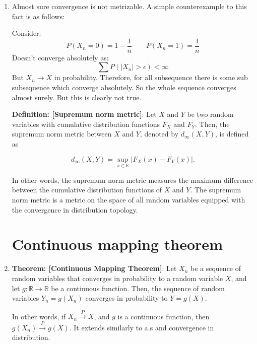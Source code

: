 \documentclass[12pt,oneside]{book}
\begin{document}
\begin{enumerate}
\item Almost sure convergence is not metrizable. A simple counterexample to this fact is as follows:

Consider:
$$P(X_n=0)=1-\frac{1}{n}\qquad P(X_n=1)=\frac{1}{n}$$
Doesn't converge absolutely as:
$$\sum P\left(|X_n|>\epsilon\right)<\infty$$
But $X_n\to X$ in probability. Therefore, for all subsequence there  is some sub subsequence which converge absolutely. So the whole sequence converges almost surely. But this is clearly not true.

\textbf{Definition: [Supremum norm metric]}: Let $X$ and $Y$ be two random variables with cumulative distribution functions $F_X$ and $F_Y$. Then, the supremum norm metric between $X$ and $Y$, denoted by $d_{\infty}(X,Y)$, is defined as

\begin{equation*}
d_{\infty}(X,Y) = \sup_{x\in\mathbb{R}} |F_X(x) - F_Y(x)|.
\end{equation*}

In other words, the supremum norm metric measures the maximum difference between the cumulative distribution functions of $X$ and $Y$.
The supremum norm metric is a metric on the space of all random variables equipped with the convergence in distribution topology.

\section{Continuous mapping theorem}
\item \textbf{Theorem: [Continuous Mapping Theorem]}: Let $X_n$ be a sequence of random variables that converges in probability to a random variable $X$, and let $g:\mathbb{R}\to\mathbb{R}$ be a continuous function. Then, the sequence of random variables $Y_n = g(X_n)$ converges in probability to $Y = g(X)$.

In other words, if $X_n \xrightarrow{P} X$, and $g$ is a continuous function, then $g(X_n) \xrightarrow{P} g(X)$.
It extends similarly to a.s and convergence in distribution.

\end{enumerate}
\end{document}
